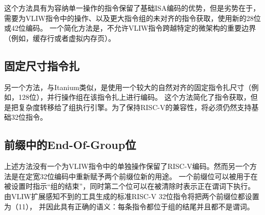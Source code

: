 这个方法具有为容纳单一操作的指令保留了基础ISA编码的优势，但是劣势在于，
需要为VLIW指令中的操作、以及更大指令组的未对齐的指令获取，使用新的28位或42位编码。
一个简化方法是，不允许VLIW指令跨越特定的微架构的重要边界（例如，缓存行或者虚拟内存页）。

\subsection*{固定尺寸指令扎}

另一个方法，与Itanium类似，是使用一个较大的自然对齐的固定指令扎尺寸（例如，128位），并行操作组在该指令扎上进行编码。
这个方法简化了指令获取，但是把复杂度转移给了组执行引擎。为了保持RISC-V的兼容性，将必须仍然支持基础32位指令。

\subsection*{前缀中的End-Of-Group位}

上述方法没有一个为VLIW指令中的单独操作保留了RISC-V编码。然而另一个方法是在定宽32位编码中重新赋予两个前缀位新的用途。
一个前缀位可以被用于在被设置时指示“组的结束”，同时第二个位可以在被清除时表示正在谓词下执行。
由VLIW扩展感知不到的工具生成的标准RISC-V 32位指令将把两个前缀位都设置为（11），
并因此具有正确的语义：每条指令都位于组的结尾并且都不是谓词。


